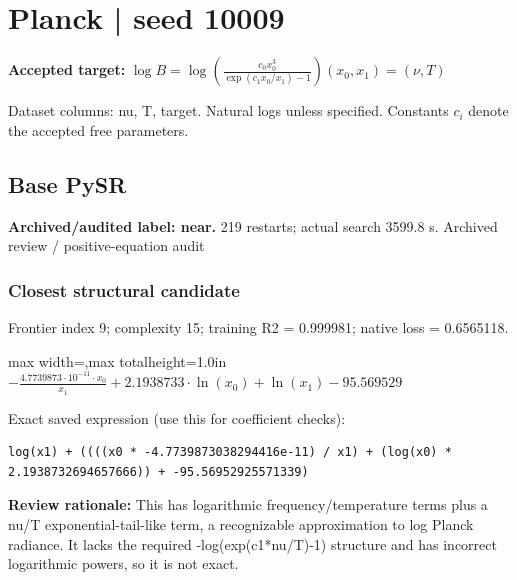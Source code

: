\documentclass[10pt,letterpaper,landscape]{article}
\begin{document}
\section*{Planck | seed 10009}
\textbf{Accepted target:} $\displaystyle \log B=\log\!\left(\frac{c_0 x_0^3}{\exp(c_1x_0/x_1)-1}\right)$\hfill $(x_0,x_1)=(\nu,T)$\par
{\small Dataset columns: nu, T, target. Natural logs unless specified. Constants $c_i$ denote the accepted free parameters.}\par\medskip
\begin{minipage}[t]{0.485\textwidth}
\subsection*{Base PySR}
\textbf{Archived/audited label: near.} 219 restarts; actual search 3599.8 s.
{\small Archived review / positive-equation audit}
\subsubsection*{Closest structural candidate}
Frontier index 9; complexity 15; training R2 = 0.999981; native loss = 0.6565118.
\begin{center}\begin{adjustbox}{max width=\linewidth,max totalheight=1.0in}$\displaystyle - \frac{4.7739873 \cdot 10^{-11} \cdot x_{0}}{x_{1}} + 2.1938733 \cdot \ln{\left(x_{0} \right)} + \ln{\left(x_{1} \right)} - 95.569529$\end{adjustbox}\end{center}
{\scriptsize Exact saved expression (use this for coefficient checks):}
\begin{lstlisting}
log(x1) + ((((x0 * -4.7739873038294416e-11) / x1) + (log(x0) * 2.1938732694657666)) + -95.56952925571339)
\end{lstlisting}
{\small\textbf{Review rationale:} This has logarithmic frequency/temperature terms plus a nu/T exponential-tail-like term, a recognizable approximation to log Planck radiance. It lacks the required -log(exp(c1*nu/T)-1) structure and has incorrect logarithmic powers, so it is not exact.}

\end{minipage}
\end{document}
